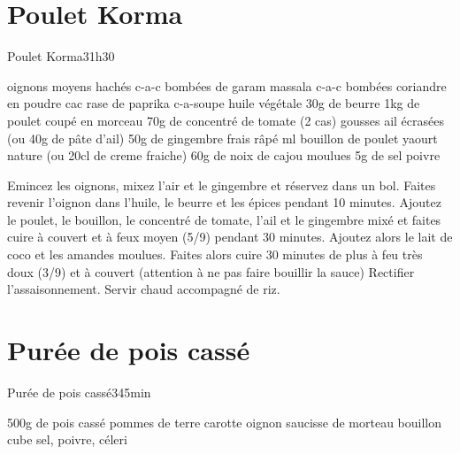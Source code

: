 {\section{Poulet Korma}
\begin{recette}{Poulet Korma}{3}{1h30}{}
\begin{ingredients}
\ingredient[etape 1]
 oignons moyens hachés
 c-a-c bombées de garam massala %
 c-a-c bombées coriandre en poudre
 cac rase de paprika
 c-a-soupe huile végétale
\ingredient 30g de beurre
\ingredient[etape 2]
\ingredient 1kg de poulet coupé en morceau
\ingredient 70g de concentré de tomate (2 cas)
 gousses ail écrasées (ou 40g de pâte d'ail)
\ingredient 50g de gingembre frais râpé %
 ml bouillon de poulet
\ingredient[etape 3]
 yaourt nature (ou 20cl de creme fraiche) %
\ingredient 60g de noix de cajou moulues
\ingredient 5g de sel
\ingredient poivre
\end{ingredients}

\begin{preparation}
\etape Emincez les oignons, mixez l'air et le gingembre et réservez dans un bol.
\etape Faites revenir l'oignon dans l'huile, le beurre et les épices pendant 10 minutes. 
\etape Ajoutez le poulet, le bouillon, le concentré de tomate, l'ail et le gingembre mixé et faites cuire à couvert et à feux moyen (5/9) pendant 30 minutes.
\etape Ajoutez alors le lait de coco et les amandes moulues. Faites alors cuire 30 minutes de plus à feu très doux (3/9) et à couvert (attention à ne pas faire bouillir la sauce) Rectifier l'assaisonnement.
\etape Servir chaud accompagné de riz.
\end{preparation}
\end{recette}

\section{Purée de pois cassé}
\begin{recette}{Purée de pois cassé}{3}{45min}{}

\begin{ingredients}
\ingredient 500g de pois cassé
 pommes de terre
 carotte
 oignon
 saucisse de morteau
 bouillon cube
\ingredient sel, poivre, céleri
\end{ingredients}


\end{recette}}
